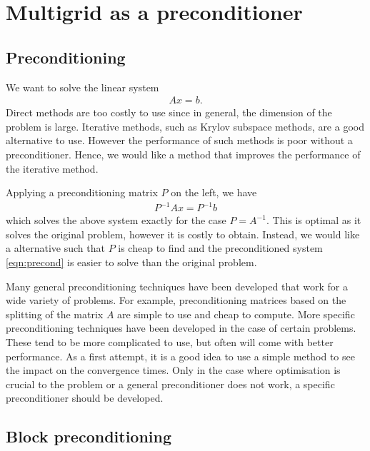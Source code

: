 
\section{Multigrid as a preconditioner}
\label{sec:precond}

\subsection{Preconditioning}

We want to solve the linear system
\begin{align}
	A x = b.
\end{align}
Direct methods are too costly to use since in general, the dimension of the problem is large.
Iterative methods, such as Krylov subspace methods, are a good alternative to use.
However the performance of such methods is poor without a preconditioner.
Hence, we would like a method that improves the performance of the iterative method.


Applying a preconditioning matrix $P$ on the left, we have
\begin{align}
	P^{-1} A x = P^{-1} b \label{eqn:precond}
\end{align}
which solves the above system exactly for the case $P=A^{-1}$. 
This is optimal as it solves the original problem, however it is costly to obtain.
Instead, we would like a alternative such that $P$ is cheap to find and the preconditioned system \eqref{eqn:precond} is easier to solve than the original problem.


Many general preconditioning techniques have been developed that work for a wide variety of problems.
For example, preconditioning matrices based on the splitting of the matrix $A$ are simple to use and cheap to compute.
More specific preconditioning techniques have been developed in the case of certain problems.
These tend to be more complicated to use, but often will come with better performance.
As a first attempt, it is a good idea to use a simple method to see the impact on the convergence times.
Only in the case where optimisation is crucial to the problem or a general preconditioner does not work, a specific preconditioner should be developed.



\subsection{Block preconditioning}

